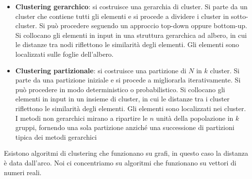 \begin{itemize}
    \item \textbf{Clustering gerarchico}: si costruisce una gerarchia di cluster.
          Si parte da un cluster che contiene tutti gli elementi e si procede a
          dividere i cluster in sotto-cluster. Si può procedere seguendo un
          approccio top-down oppure bottom-up. Si collocano gli elementi in input
          in una struttura gerarchica ad albero, in cui le distanze tra nodi
          riflettono le similarità degli elementi. Gli elementi sono localizzati
          sulle foglie dell'albero.
    \item \textbf{Clustering partizionale}: si costruisce una partizione di $N$
          in $k$ cluster. Si parte da una partizione iniziale e si procede a
          migliorarla iterativamente. Si può procedere in modo deterministico o
          probabilistico. Si collocano gli elementi in input in un insieme di
          cluster, in cui le distanze tra i cluster riflettono le similarità
          degli elementi. Gli elementi sono localizzati nei cluster. I metodi non
          gerarchici mirano a ripartire le $n$ unità della popolazione in $k$
          gruppi, fornendo una sola partizione anziché una successione di
          partizioni tipica dei metodi gerarchici
\end{itemize}
Esistono algoritmi di clustering che funzionano su grafi, in questo caso la
distanza è data dall'arco. Noi ci concentriamo su algoritmi che funzionano su
vettori di numeri reali.
